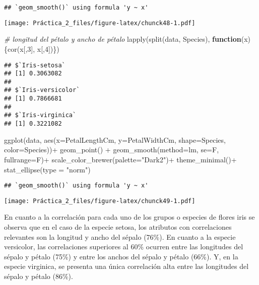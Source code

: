 \documentclass[
]{article}
\newenvironment{Shaded}{\begin{snugshade}}{\end{snugshade}}
\newcommand{\AttributeTok}[1]{\textcolor[rgb]{0.77,0.63,0.00}{#1}}
\newcommand{\CommentTok}[1]{\textcolor[rgb]{0.56,0.35,0.01}{\textit{#1}}}
\newcommand{\ControlFlowTok}[1]{\textcolor[rgb]{0.13,0.29,0.53}{\textbf{#1}}}
\newcommand{\DecValTok}[1]{\textcolor[rgb]{0.00,0.00,0.81}{#1}}
\newcommand{\FunctionTok}[1]{\textcolor[rgb]{0.00,0.00,0.00}{#1}}
\newcommand{\NormalTok}[1]{#1}
\newcommand{\SpecialCharTok}[1]{\textcolor[rgb]{0.00,0.00,0.00}{#1}}
\newcommand{\StringTok}[1]{\textcolor[rgb]{0.31,0.60,0.02}{#1}}
\begin{document}
\begin{verbatim}
## `geom_smooth()` using formula 'y ~ x'
\end{verbatim}

\texttt{[image: Práctica\_2\_files/figure-latex/chunck48-1.pdf]}

\begin{Shaded}
\begin{Highlighting}[]
\CommentTok{\# longitud del pétalo y ancho de pétalo}
\FunctionTok{lapply}\NormalTok{(}\FunctionTok{split}\NormalTok{(data, Species), }\ControlFlowTok{function}\NormalTok{(x)\{}\FunctionTok{cor}\NormalTok{(x[,}\DecValTok{3}\NormalTok{], x[,}\DecValTok{4}\NormalTok{])\})}
\end{Highlighting}
\end{Shaded}

\begin{verbatim}
## $`Iris-setosa`
## [1] 0.3063082
## 
## $`Iris-versicolor`
## [1] 0.7866681
## 
## $`Iris-virginica`
## [1] 0.3221082
\end{verbatim}

\begin{Shaded}
\begin{Highlighting}[]
\FunctionTok{ggplot}\NormalTok{(data, }\FunctionTok{aes}\NormalTok{(}\AttributeTok{x=}\NormalTok{PetalLengthCm, }\AttributeTok{y=}\NormalTok{PetalWidthCm, }\AttributeTok{shape=}\NormalTok{Species, }\AttributeTok{color=}\NormalTok{Species))}\SpecialCharTok{+}
  \FunctionTok{geom\_point}\NormalTok{() }\SpecialCharTok{+}
  \FunctionTok{geom\_smooth}\NormalTok{(}\AttributeTok{method=}\NormalTok{lm, }\AttributeTok{se=}\NormalTok{F, }\AttributeTok{fullrange=}\NormalTok{F)}\SpecialCharTok{+}
  \FunctionTok{scale\_color\_brewer}\NormalTok{(}\AttributeTok{palette=}\StringTok{"Dark2"}\NormalTok{)}\SpecialCharTok{+}
  \FunctionTok{theme\_minimal}\NormalTok{()}\SpecialCharTok{+}
  \FunctionTok{stat\_ellipse}\NormalTok{(}\AttributeTok{type =} \StringTok{"norm"}\NormalTok{)}
\end{Highlighting}
\end{Shaded}

\begin{verbatim}
## `geom_smooth()` using formula 'y ~ x'
\end{verbatim}

\texttt{[image: Práctica\_2\_files/figure-latex/chunck49-1.pdf]}

En cuanto a la correlación para cada uno de los grupos o especies de
flores iris se observa que en el caso de la especie setosa, los
atributos con correlaciones relevantes son la longitud y ancho del
sépalo (76\%). En cuanto a la especie versicolor, las correlaciones
superiores al 60\% ocurren entre las longitudes del sépalo y pétalo
(75\%) y entre los anchos del sépalo y pétalo (66\%). Y, en la especie
virginica, se presenta una única correlación alta entre las longitudes
del sépalo y pétalo (86\%).
\end{document}
